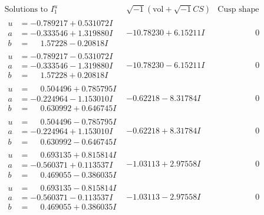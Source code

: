 \documentclass[1p]{elsarticle_modified}
\theoremstyle{definition}
\newcommand{\I}{\sqrt{-1}}
\begin{document}
$$\begin{array}{c|c|c}  
\text{Solutions to }I^u_{1}& \I (\text{vol} + \sqrt{-1}CS) & \text{Cusp shape}\\
 \hline 
\begin{aligned}
u &= -0.789217 + 0.531072 I \\
a &= -0.333546 + 1.319880 I \\
b &= \phantom{-}1.57228 - 0.20818 I\end{aligned}
 & -10.78230 + 6.15211 I & \phantom{-0.000000 } 0 \\ \hline\begin{aligned}
u &= -0.789217 - 0.531072 I \\
a &= -0.333546 - 1.319880 I \\
b &= \phantom{-}1.57228 + 0.20818 I\end{aligned}
 & -10.78230 - 6.15211 I & \phantom{-0.000000 } 0 \\ \hline\begin{aligned}
u &= \phantom{-}0.504496 + 0.785795 I \\
a &= -0.224964 - 1.153010 I \\
b &= \phantom{-}0.630992 + 0.646745 I\end{aligned}
 & -0.62218 - 8.31784 I & \phantom{-0.000000 } 0 \\ \hline\begin{aligned}
u &= \phantom{-}0.504496 - 0.785795 I \\
a &= -0.224964 + 1.153010 I \\
b &= \phantom{-}0.630992 - 0.646745 I\end{aligned}
 & -0.62218 + 8.31784 I & \phantom{-0.000000 } 0 \\ \hline\begin{aligned}
u &= \phantom{-}0.693135 + 0.815814 I \\
a &= -0.560371 + 0.113537 I \\
b &= \phantom{-}0.469055 - 0.386035 I\end{aligned}
 & -1.03113 + 2.97558 I & \phantom{-0.000000 } 0 \\ \hline\begin{aligned}
u &= \phantom{-}0.693135 - 0.815814 I \\
a &= -0.560371 - 0.113537 I \\
b &= \phantom{-}0.469055 + 0.386035 I\end{aligned}
 & -1.03113 - 2.97558 I & \phantom{-0.000000 } 0 \\ \hline\begin{aligned}

\end{aligned}
\end{array}$$
\end{document}
